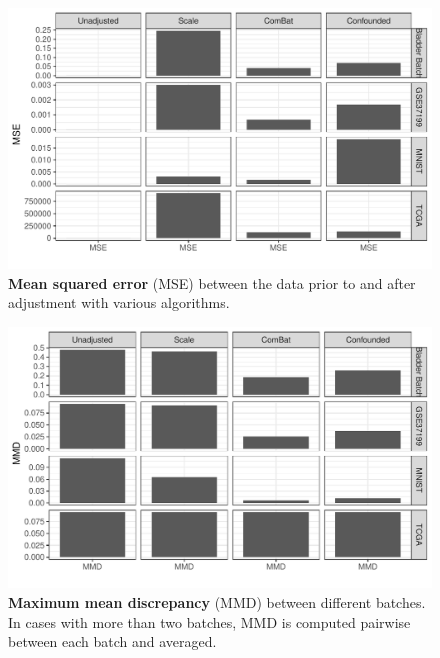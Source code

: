 \documentclass[notitlepage]{article}
\begin{document}
\begin{figure}
	\centering
	\includegraphics[width=\columnwidth]{figures/final/mse}
	\caption{\textbf{Mean squared error} (MSE) between the data prior to and after adjustment with various algorithms.}
	\label{fig:mse}
\end{figure}
\begin{figure}
	\centering
	\includegraphics[width=\columnwidth]{figures/final/mmd}
	\caption{\textbf{Maximum mean discrepancy} (MMD) between different batches.
	In cases with more than two batches, MMD is computed pairwise between each batch and averaged.}
	\label{fig:mmd}
\end{figure}
\end{document}
